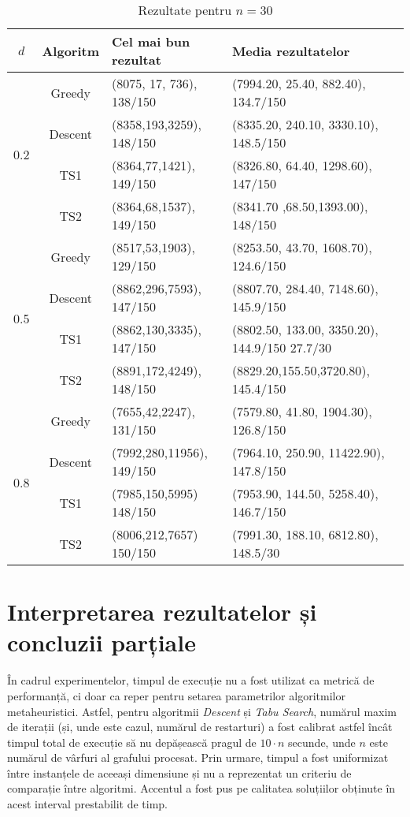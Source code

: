 \begin{table}[H]
\centering
\caption{Rezultate pentru $n = 30$}
\begin{tabular}{ccll}
\toprule
$d$ & Algoritm & Cel mai bun rezultat  & Media rezultatelor \\
\midrule
\multirow{4}{*}{0.2}
  & Greedy  & (8075, 17, 736), 138/150 & (7994.20, 25.40, 882.40), 134.7/150 \\
  & Descent & (8358,193,3259), 148/150   & (8335.20, 240.10, 3330.10), 148.5/150 \\
  & TS1     & (8364,77,1421), 149/150    & (8326.80, 64.40, 1298.60), 147/150 \\
  & TS2     & (8364,68,1537), 149/150    & (8341.70 ,68.50,1393.00), 148/150 \\
\midrule
\multirow{4}{*}{0.5}
  & Greedy  & (8517,53,1903), 129/150     & (8253.50, 43.70, 1608.70), 124.6/150 \\
  & Descent & (8862,296,7593), 147/150    & (8807.70, 284.40, 7148.60), 145.9/150 \\
  & TS1     & (8862,130,3335), 147/150    & (8802.50, 133.00, 3350.20), 144.9/150
  27.7/30 \\
  & TS2     & (8891,172,4249), 148/150    & (8829.20,155.50,3720.80), 145.4/150 \\
\midrule
\multirow{4}{*}{0.8}
  & Greedy  & (7655,42,2247), 131/150     & (7579.80, 41.80, 1904.30), 126.8/150 \\
  & Descent & (7992,280,11956), 149/150    & (7964.10, 250.90, 11422.90), 147.8/150 \\
  & TS1     & (7985,150,5995) 148/150     &  (7953.90, 144.50, 5258.40), 146.7/150 \\
  & TS2     &  (8006,212,7657) 150/150    &  (7991.30, 188.10, 6812.80), 148.5/30 \\
\bottomrule
\end{tabular}\label{tab:rezultate_n150}
\end{table}



\section{Interpretarea rezultatelor și concluzii parțiale}
\noindent
În cadrul experimentelor, timpul de execuție nu a fost utilizat ca metrică de performanță, ci doar ca reper pentru setarea parametrilor algoritmilor metaheuristici. Astfel, pentru algoritmii \textit{Descent} și \textit{Tabu Search}, numărul maxim de iterații (și, unde este cazul, numărul de restarturi) a fost calibrat astfel încât timpul total de execuție să nu depășească pragul de $10 \cdot n$ secunde, unde $n$ este numărul de vârfuri al grafului procesat. Prin urmare, timpul a fost uniformizat între instanțele de aceeași dimensiune și nu a reprezentat un criteriu de comparație între algoritmi. Accentul a fost pus pe calitatea soluțiilor obținute în acest interval prestabilit de timp.
